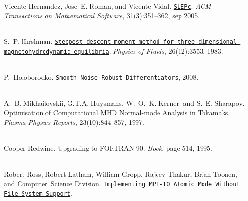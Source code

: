 \begin{DoxyDescription}
\item[{\parbox[t]{\linewidth}{\label{citelist_CITEREF_hernandez2005slepc}%
\Hypertarget{citelist_CITEREF_hernandez2005slepc}%
\+[6]}}]\hfill \\
Vicente Hernandez, Jose~E. Roman, and Vicente Vidal. \href{http://portal.acm.org/citation.cfm?doid=1089014.1089019}{\texttt{SLEPc}}. {\itshape ACM Transactions on Mathematical Software}, 31(3):351--362, sep 2005. 


\item[{\parbox[t]{\linewidth}{\label{citelist_CITEREF_hirshman1983vmec}%
\Hypertarget{citelist_CITEREF_hirshman1983vmec}%
\+[7]}}]\hfill \\
S.~P. Hirshman. \href{http://scitation.aip.org/content/aip/journal/pof1/26/12/10.1063/1.864116}{\texttt{Steepest-\/descent moment method for three-\/dimensional magnetohydrodynamic equilibria}}. {\itshape Physics of Fluids}, 26(12):3553, 1983. 


\item[{\parbox[t]{\linewidth}{\label{citelist_CITEREF_holoborodko2008diff}%
\Hypertarget{citelist_CITEREF_holoborodko2008diff}%
\+[8]}}]\hfill \\
P.~Holoborodko. \href{http://www.holoborodko.com/pavel/numerical-methods/numerical-derivative/smooth-low-noise-differentiators/}{\texttt{Smooth Noise Robust Differentiators}}, 2008.


\item[{\parbox[t]{\linewidth}{\label{citelist_CITEREF_mikhailovskii1997optimization}%
\Hypertarget{citelist_CITEREF_mikhailovskii1997optimization}%
\+[9]}}]\hfill \\
A.~B. Mikhailovskii, G.\+T.\+A. Huysmans, W.~O.~K. Kerner, and S.~E. Sharapov. Optimisation of Computational MHD Normal-\/mode Analysis in Tokamaks. {\itshape Plasma Physics Reports}, 23(10):844--857, 1997.


\item[{\parbox[t]{\linewidth}{\label{citelist_CITEREF_redwinef90}%
\Hypertarget{citelist_CITEREF_redwinef90}%
\+[10]}}]\hfill \\
Cooper Redwine. Upgrading to FORTRAN 90. {\itshape Book}, page 514, 1995. 


\item[{\parbox[t]{\linewidth}{\label{citelist_CITEREF_rossatomicio}%
\Hypertarget{citelist_CITEREF_rossatomicio}%
\+[11]}}]\hfill \\
Robert Ross, Robert Latham, William Gropp, Rajeev Thakur, Brian Toonen, and Computer~Science Division. \href{http://www.mcs.anl.gov/~thakur/papers/atomic-mode.pdf}{\texttt{Implementing MPI-\/\+IO Atomic Mode Without File System Support}}.



\end{DoxyDescription}
